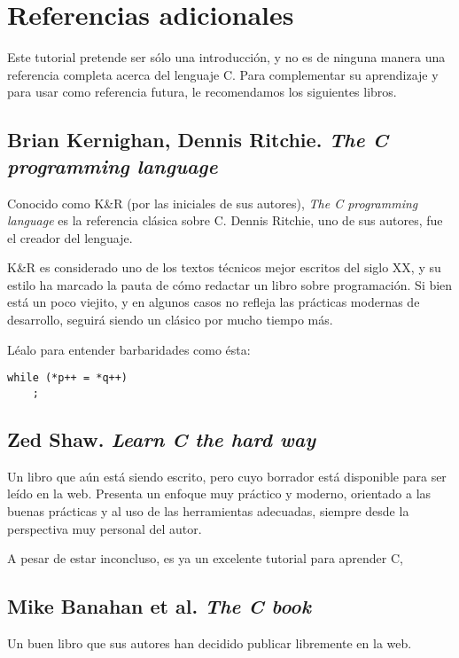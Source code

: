 \section{Referencias adicionales}

Este tutorial pretende ser sólo una introducción, y no es de ninguna
manera una referencia completa acerca del lenguaje C. Para complementar
su aprendizaje y para usar como referencia futura, le recomendamos los
siguientes libros.

\subsection{Brian Kernighan, Dennis Ritchie. \emph{The C programming
language}}

Conocido como K\&R (por las iniciales de sus autores), \emph{The C
programming language} es la referencia clásica sobre C. Dennis Ritchie,
uno de sus autores, fue el creador del lenguaje.

K\&R es considerado uno de los textos técnicos mejor escritos del siglo
XX, y su estilo ha marcado la pauta de cómo redactar un libro sobre
programación. Si bien está un poco viejito, y en algunos casos no
refleja las prácticas modernas de desarrollo, seguirá siendo un clásico
por mucho tiempo más.

Léalo para entender barbaridades como ésta:

\begin{lstlisting}
while (*p++ = *q++)
    ;
\end{lstlisting}

\subsection{Zed Shaw. \emph{Learn C the hard way}}

Un libro que aún está siendo escrito, pero cuyo borrador está disponible
para ser leído en la web. Presenta un enfoque muy práctico y moderno,
orientado a las buenas prácticas y al uso de las herramientas adecuadas,
siempre desde la perspectiva muy personal del autor.

A pesar de estar inconcluso, es ya un excelente tutorial para aprender
C,

\subsection{Mike Banahan et al. \emph{The C book}}

Un buen libro que sus autores han decidido publicar libremente en la
web.
